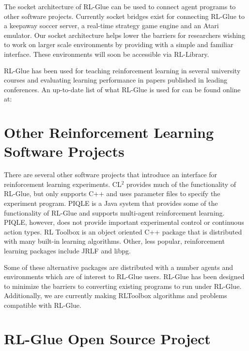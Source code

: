 \documentclass[twopage,11pt]{article}
\begin{document}
The socket architecture of RL-Glue can be used to connect agent programs to other software projects. Currently socket bridges exist for connecting RL-Glue to a keepaway soccer server, a real-time strategy game engine and an Atari emulator. Our socket architecture helps lower the barriers for researchers wishing to work on larger scale environments by providing with a simple and familiar interface. These environments will soon be accessible via RL-Library. 


RL-Glue has been used for teaching reinforcement learning in several university courses and evaluating learning performance in papers published in leading conferences. An up-to-date list of what RL-Glue is used for can be found online at:%




\section{Other Reinforcement Learning Software Projects}

There are several other software projects that introduce an interface for reinforcement learning experiments. CL$^2$ provides much of the functionality of RL-Glue, but only supports C++ and uses parameter files to specify the experiment program. PIQLE is a Java system that provides some of the functionality of RL-Glue and supports multi-agent reinforcement learning. PIQLE, however, does not provide important experimental control or continuous action types. RL Toolbox is an object oriented C++ package that is distributed with many built-in learning algorithms. Other, less popular, reinforcement learning packages include JRLF and libpg. 

Some of these alternative packages are distributed with a number agents and environments which are of interest to RL-Glue users. RL-Glue has been designed to minimize the barriers to converting existing programs to run under RL-Glue. Additionally, we are currently making RLToolbox algorithms and problems compatible with RL-Glue. 






 
 
 
\section{RL-Glue Open Source Project}
\end{document}
